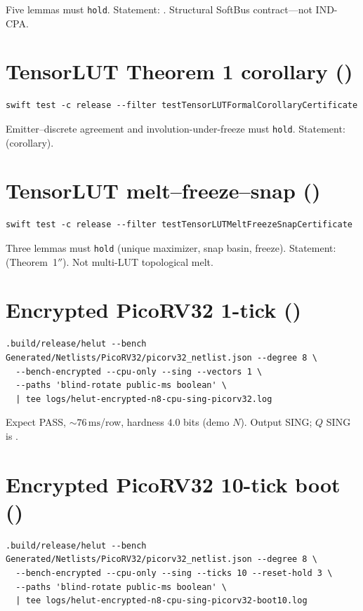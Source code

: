 Five lemmas must \texttt{hold}. Statement:
.
Structural SoftBus contract---not IND-CPA.

\section{TensorLUT Theorem 1 corollary ()}

\begin{lstlisting}
swift test -c release --filter testTensorLUTFormalCorollaryCertificate
\end{lstlisting}

Emitter--discrete agreement and involution-under-freeze must \texttt{hold}.
Statement:  (corollary).

\section{TensorLUT melt--freeze--snap ()}

\begin{lstlisting}
swift test -c release --filter testTensorLUTMeltFreezeSnapCertificate
\end{lstlisting}

Three lemmas must \texttt{hold} (unique maximizer, snap basin, freeze).
Statement:  (Theorem~1$''$).
Not multi-LUT topological melt.

\section{Encrypted PicoRV32 1-tick ()}

\begin{lstlisting}
.build/release/helut --bench Generated/Netlists/PicoRV32/picorv32_netlist.json --degree 8 \
  --bench-encrypted --cpu-only --sing --vectors 1 \
  --paths 'blind-rotate public-ms boolean' \
  | tee logs/helut-encrypted-n8-cpu-sing-picorv32.log
\end{lstlisting}

Expect PASS, ${\sim}76\,\mathrm{ms}$/row, hardness $4.0$ bits (demo $N$).
Output SING; $Q$ SING is .

\section{Encrypted PicoRV32 10-tick boot (\cid{46})}

\begin{lstlisting}
.build/release/helut --bench Generated/Netlists/PicoRV32/picorv32_netlist.json --degree 8 \
  --bench-encrypted --cpu-only --sing --ticks 10 --reset-hold 3 \
  --paths 'blind-rotate public-ms boolean' \
  | tee logs/helut-encrypted-n8-cpu-sing-picorv32-boot10.log
\end{lstlisting}

